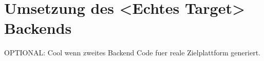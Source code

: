 \chapter{Umsetzung des <Echtes Target> Backends}
\label{chapter}

OPTIONAL: Cool wenn zweites Backend Code fuer reale Zielplattform generiert.
